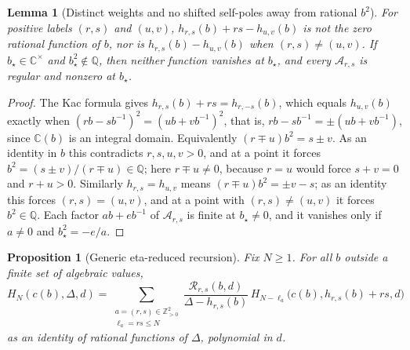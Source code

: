 \documentclass[twoside,10pt]{article}
\numberwithin{equation}{section}
\theoremstyle{slbody}
\newtheorem{proposition}[theorem]{Proposition}
\newtheorem{lemma}[theorem]{Lemma}
\theoremstyle{definition}
\theoremstyle{remark}
\begin{document}
\begin{lemma}[Distinct weights and no shifted self-poles away from
rational \(b^2\)]
\label{lem:no-generic-shifted-pole}
For positive labels \((r,s)\) and \((u,v)\), \(h_{r,s}(b)+rs-h_{u,v}(b)\)
is not the zero rational function of \(b\), nor is
\(h_{r,s}(b)-h_{u,v}(b)\) when \((r,s)\neq(u,v)\).  If
\(b_\star\in\mathbb C^\times\) and \(b_\star^2\notin\mathbb Q\), then
neither function vanishes at \(b_\star\), and every
\({\mathcal A}_{r,s}\) is regular and nonzero at \(b_\star\).
\end{lemma}

\begin{proof}
The Kac formula gives \(h_{r,s}(b)+rs=h_{r,-s}(b)\), which equals
\(h_{u,v}(b)\) exactly when \((rb-sb^{-1})^2=(ub+vb^{-1})^2\), that is,
\(rb-sb^{-1}=\pm(ub+vb^{-1})\), since \(\mathbb C(b)\) is an integral
domain.  Equivalently
\((r\mp u)b^2=s\pm v\).  As an identity in \(b\) this contradicts
\(r,s,u,v>0\), and at a point it forces \(b^2=(s\pm v)/(r\mp u)\in\mathbb Q\);
here \(r\mp u\neq0\), because \(r=u\) would force \(s+v=0\) and
\(r+u>0\).  Similarly
\(h_{r,s}=h_{u,v}\) means \((r\mp u)b^2=\pm v-s\); as an identity this
forces \((r,s)=(u,v)\), and at a point with \((r,s)\neq(u,v)\) it forces
\(b^2\in\mathbb Q\).  Each factor \(ab+eb^{-1}\) of
\({\mathcal A}_{r,s}\) is finite at \(b_\star\neq0\), and it vanishes only
if \(a\neq0\) and \(b_\star^2=-e/a\).
\end{proof}

\begin{proposition}[Generic eta-reduced recursion]
\label{prop:generic-recursion}
Fix \(N\geq1\).  For all \(b\) outside a finite set of algebraic values,
\[
 H_N(c(b),\Delta,d)
 =\sum_{\substack{a=(r,s)\in\mathbb Z_{>0}^2\\ \ell_a=rs\leq N}}
 \frac{{\mathcal R}_{r,s}(b,d)}{\Delta-h_{r,s}(b)}\,
 H_{N-\ell_a}\bigl(c(b),h_{r,s}(b)+rs,d\bigr)
\]
as an identity of rational functions of \(\Delta\), polynomial in
\(d\).
\end{proposition}
\end{document}
